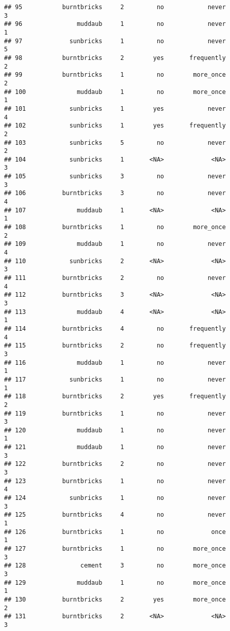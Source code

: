 \documentclass[
]{article}
\begin{document}
\begin{verbatim}
## 95           burntbricks     2         no            never         3
## 96               muddaub     1         no            never         1
## 97             sunbricks     1         no            never         5
## 98           burntbricks     2        yes       frequently         2
## 99           burntbricks     1         no        more_once         2
## 100              muddaub     1         no        more_once         1
## 101            sunbricks     1        yes            never         4
## 102            sunbricks     1        yes       frequently         2
## 103            sunbricks     5         no            never         2
## 104            sunbricks     1       <NA>             <NA>         3
## 105            sunbricks     3         no            never         3
## 106          burntbricks     3         no            never         4
## 107              muddaub     1       <NA>             <NA>         1
## 108          burntbricks     1         no        more_once         2
## 109              muddaub     1         no            never         4
## 110            sunbricks     2       <NA>             <NA>         3
## 111          burntbricks     2         no            never         4
## 112          burntbricks     3       <NA>             <NA>         3
## 113              muddaub     4       <NA>             <NA>         1
## 114          burntbricks     4         no       frequently         4
## 115          burntbricks     2         no       frequently         3
## 116              muddaub     1         no            never         1
## 117            sunbricks     1         no            never         1
## 118          burntbricks     2        yes       frequently         2
## 119          burntbricks     1         no            never         3
## 120              muddaub     1         no            never         1
## 121              muddaub     1         no            never         3
## 122          burntbricks     2         no            never         3
## 123          burntbricks     1         no            never         4
## 124            sunbricks     1         no            never         3
## 125          burntbricks     4         no            never         1
## 126          burntbricks     1         no             once         1
## 127          burntbricks     1         no        more_once         3
## 128               cement     3         no        more_once         3
## 129              muddaub     1         no        more_once         1
## 130          burntbricks     2        yes        more_once         2
## 131          burntbricks     2       <NA>             <NA>         3

\end{verbatim}
\end{document}
